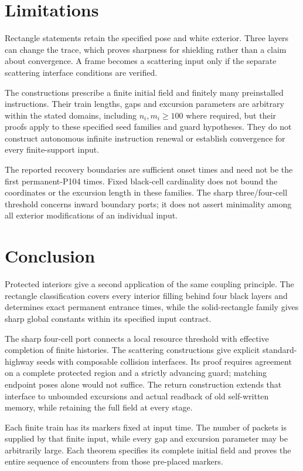 \documentclass[11pt]{article}
\begin{document}
\section{Limitations}
Rectangle statements retain the specified pose and white exterior. Three layers
can change the trace, which proves sharpness for shielding rather than a claim
about convergence. A frame becomes a scattering input only if the separate
scattering interface conditions are verified.

The constructions prescribe a finite initial field and finitely many
preinstalled instructions. Their train lengths, gaps and excursion parameters
are arbitrary within the stated domains, including $n_i,m_i\ge100$ where
required, but their proofs apply to these specified seed families and guard
hypotheses. They do not construct autonomous infinite instruction renewal or
establish convergence for every finite-support input.

The reported recovery boundaries are sufficient onset times and need not be
the first permanent-P104 times. Fixed black-cell cardinality does not bound
the coordinates or the excursion length in these families. The sharp
three/four-cell threshold concerns inward boundary ports; it does not assert
minimality among all exterior modifications of an individual input.

\section{Conclusion}
Protected interiors give a second application of the same coupling principle.
The rectangle classification covers every interior filling behind four black
layers and determines exact permanent entrance times, while the solid-rectangle
family gives sharp global constants within its specified input contract.

The sharp four-cell port connects a local resource threshold with effective
completion of finite histories. The scattering constructions give explicit standard-highway seeds with
composable collision interfaces. Its proof requires agreement on a complete
protected region and a strictly advancing guard; matching endpoint poses alone
would not suffice. The return construction extends that interface to
unbounded excursions and actual readback of old self-written memory, while
retaining the full field at every stage.

Each finite train has its markers fixed at input time. The number of packets
is supplied by that finite input, while every gap and excursion parameter may
be arbitrarily large. Each theorem specifies its complete initial field and proves the entire
sequence of encounters from those pre-placed markers.
\end{document}
